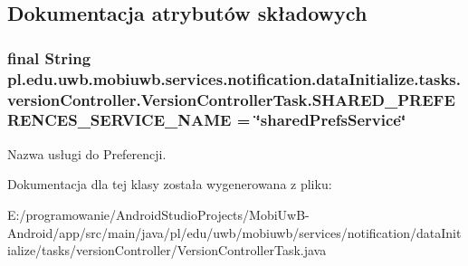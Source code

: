 \subsection{Dokumentacja atrybutów składowych}
\hypertarget{classpl_1_1edu_1_1uwb_1_1mobiuwb_1_1services_1_1notification_1_1data_initialize_1_1tasks_1_1versb679418f62fa2115aa7975dd3e456693_a91c04a56b8b2f87e79889f1bc2045f20}{}
\subsubsection[{S\+H\+A\+R\+E\+D\+\_\+\+P\+R\+E\+F\+E\+R\+E\+N\+C\+E\+S\+\_\+\+S\+E\+R\+V\+I\+C\+E\+\_\+\+N\+A\+M\+E}]{\setlength{\rightskip}{0pt plus 5cm}final String pl.\+edu.\+uwb.\+mobiuwb.\+services.\+notification.\+data\+Initialize.\+tasks.\+version\+Controller.\+Version\+Controller\+Task.\+S\+H\+A\+R\+E\+D\+\_\+\+P\+R\+E\+F\+E\+R\+E\+N\+C\+E\+S\+\_\+\+S\+E\+R\+V\+I\+C\+E\+\_\+\+N\+A\+M\+E = \char`\"{}shared\+Prefs\+Service\char`\"{}\hspace{0.3cm}{\ttfamily [static]}}\label{classpl_1_1edu_1_1uwb_1_1mobiuwb_1_1services_1_1notification_1_1data_initialize_1_1tasks_1_1versb679418f62fa2115aa7975dd3e456693_a91c04a56b8b2f87e79889f1bc2045f20}
Nazwa usługi do Preferencji. 

Dokumentacja dla tej klasy została wygenerowana z pliku\+:\begin{DoxyCompactItemize}
\item 
E\+:/programowanie/\+Android\+Studio\+Projects/\+Mobi\+Uw\+B-\/\+Android/app/src/main/java/pl/edu/uwb/mobiuwb/services/notification/data\+Initialize/tasks/version\+Controller/Version\+Controller\+Task.\+java\end{DoxyCompactItemize}
